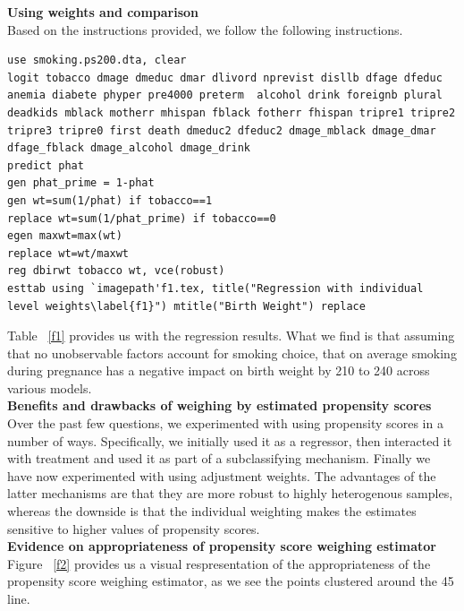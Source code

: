 \documentclass[12pt]{article}
\begin{document}
\textbf{Using weights and comparison}\\
Based on the instructions provided, we follow the following instructions.
\begin{lstlisting}
use smoking.ps200.dta, clear
logit tobacco dmage dmeduc dmar dlivord nprevist disllb dfage dfeduc  anemia diabete phyper pre4000 preterm  alcohol drink foreignb plural deadkids mblack motherr mhispan fblack fotherr fhispan tripre1 tripre2 tripre3 tripre0 first death dmeduc2 dfeduc2 dmage_mblack dmage_dmar dfage_fblack dmage_alcohol dmage_drink
predict phat
gen phat_prime = 1-phat
gen wt=sum(1/phat) if tobacco==1
replace wt=sum(1/phat_prime) if tobacco==0
egen maxwt=max(wt)
replace wt=wt/maxwt
reg dbirwt tobacco wt, vce(robust)
esttab using `imagepath'f1.tex, title("Regression with individual level weights\label{f1}") mtitle("Birth Weight") replace
\end{lstlisting}

Table ~\ref{f1} provides us with the regression results. What we find is that assuming that no unobservable factors account for smoking choice, that on average smoking during pregnance has a negative impact on birth weight by 210 to 240 across various models.\\

 
\textbf{Benefits and drawbacks of weighing by estimated propensity scores}\\
Over the past few questions, we experimented with using propensity scores in a number of ways. Specifically, we initially used it as a regressor, then interacted it with treatment and used it as part of a subclassifying mechanism. Finally we have now experimented with using adjustment weights. The advantages of the latter mechanisms are that they are more robust to highly heterogenous samples, whereas the downside is that the individual weighting makes the estimates sensitive to higher values of propensity scores.\\

\textbf{Evidence on appropriateness of propensity score weighing estimator}\\
Figure ~\ref{f2} provides us a visual respresentation of the appropriateness of the propensity score weighing estimator, as we see the points clustered around the 45 line.\\
\end{document}
